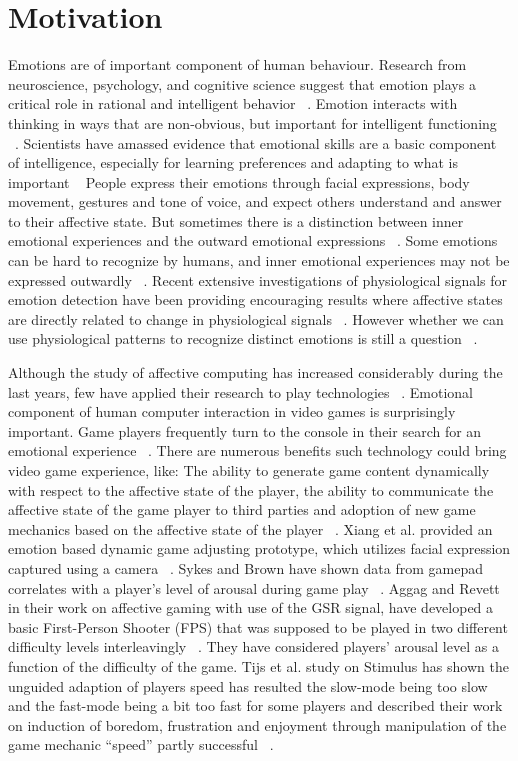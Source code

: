 \section{Motivation}
Emotions are of important component of human behaviour. Research from neuroscience, psychology, and cognitive science suggest that emotion plays a critical role in rational and intelligent behavior ~\cite{picard2001toward}. Emotion interacts with thinking in ways that are non-obvious, but important for intelligent functioning ~\cite{picard2001toward}. Scientists have amassed evidence that emotional skills are a basic component of intelligence, especially for learning preferences and adapting to what is important ~\cite{mayer1993intelligence, goleman2006emotional} People express their emotions through facial expressions, body movement, gestures and tone of voice, and expect others understand and answer to their affective state. But sometimes there is a distinction between inner emotional experiences and the outward emotional expressions ~\cite{picard2003affective}. Some emotions can be hard to recognize by humans, and inner emotional experiences may not be expressed outwardly ~\cite{jones2007biometric}. Recent extensive investigations of physiological signals for emotion detection have been providing encouraging results where affective states are directly related to change in physiological signals ~\cite{jones2007biometric}. However whether we can use physiological patterns to recognize distinct emotions is still a question ~\cite{picard2001toward, cacioppo1990inferring}.

Although the study of affective computing has increased considerably during the last years, few have applied their research to play technologies ~\cite{sykes2003affective}. Emotional component of human computer interaction in video games is surprisingly important. Game players frequently turn to the console in their search for an emotional experience ~\cite{rouse2010game}. There are numerous benefits such technology could bring video game experience, like: The ability to generate game content dynamically with respect to the affective state of the player, the ability to communicate the affective state of the game player to third parties and adoption of new game mechanics based on the affective state of the player ~\cite{sykes2003affective}. Xiang et al. provided an emotion based dynamic game adjusting prototype, which utilizes facial expression captured using a camera ~\cite{xiang2013dynamic}. Sykes and Brown have shown data from gamepad correlates with a player's level of arousal during game play ~\cite{sykes2003affective}. Aggag and Revett in their work on affective gaming with use of the GSR signal, have developed a basic First-Person Shooter (FPS) that was supposed to be played in two different difficulty levels interleavingly ~\cite{aggag2011affective}. They have considered players' arousal level as a function of the difficulty of the game. Tijs et al. study on Stimulus has shown the unguided adaption of players speed has resulted the slow-mode being too slow and the fast-mode being a bit too fast for some players and described their work on induction of boredom, frustration and enjoyment through manipulation of the game mechanic ``speed'' partly successful ~\cite{tijs2009creating}.

